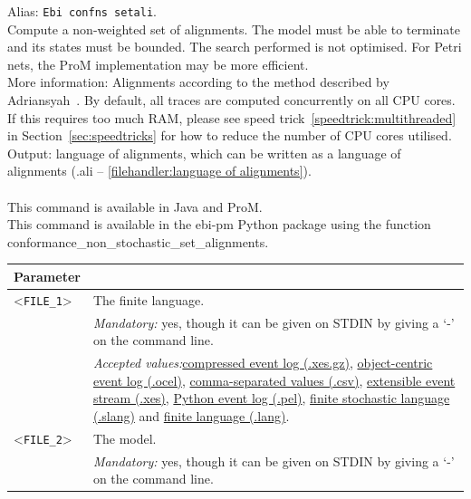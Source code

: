 {Alias: \texttt{Ebi confns setali}.\\
Compute a non-weighted set of alignments.
The model must be able to terminate and its states must be bounded. The search performed is not optimised. For Petri nets, the ProM implementation may be more efficient.\\
More information: Alignments according to the method described by Adriansyah~\cite{DBLP:conf/edoc/AdriansyahDA11}. By default, all traces are computed concurrently on all CPU cores. If this requires too much RAM, please see speed trick~\ref{speedtrick:multithreaded} in Section~\ref{sec:speedtricks} for how to reduce the number of CPU cores utilised.~\\
\noindent Output: language of alignments, which can be written as a language of alignments (.ali -- \cref{filehandler:language of alignments}).\\
\\This command is available in Java and ProM.
\\This command is available in the ebi-pm Python package using the function conformance\_non\_stochastic\_set\_alignments.
\begin{tabularx}{\linewidth}{lX}
\toprule
Parameter \\\midrule
<\texttt{FILE\_1}>&The finite language.\\
&\textit{Mandatory:} \quad yes, though it can be given on STDIN by giving a `-' on the command line.\\
&\textit{Accepted values:}\quad \hyperref[filehandler:compressed event log]{compressed event log (.xes.gz)}, \hyperref[filehandler:object-centric event log]{object-centric event log (.ocel)}, \hyperref[filehandler:comma-separated values]{comma-separated values (.csv)}, \hyperref[filehandler:extensible event stream]{extensible event stream (.xes)}, \hyperref[filehandler:Python event log]{Python event log (.pel)}, \hyperref[filehandler:finite stochastic language]{finite stochastic language (.slang)} and \hyperref[filehandler:finite language]{finite language (.lang)}.\\
<\texttt{FILE\_2}>&The model.\\
&\textit{Mandatory:} \quad yes, though it can be given on STDIN by giving a `-' on the command line.\\

\end{tabularx}}
